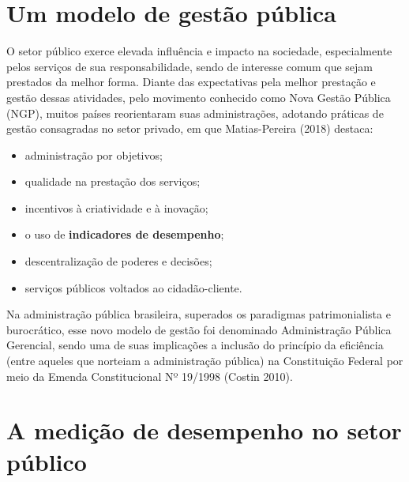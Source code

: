 \documentclass[
  letterpaper,
  DIV=11,
  numbers=noendperiod]{scrreprt}
\begin{document}
\hypertarget{um-modelo-de-gestuxe3o-puxfablica}{%
\section*{Um modelo de gestão
pública}\label{um-modelo-de-gestuxe3o-puxfablica}}


O setor público exerce elevada influência e impacto na sociedade,
especialmente pelos serviços de sua responsabilidade, sendo de interesse
comum que sejam prestados da melhor forma. Diante das expectativas pela
melhor prestação e gestão dessas atividades, pelo movimento conhecido
como Nova Gestão Pública (NGP), muitos países reorientaram suas
administrações, adotando práticas de gestão consagradas no setor
privado, em que Matias-Pereira (2018) destaca:

\begin{itemize}
\item
  administração por objetivos;
\item
  qualidade na prestação dos serviços;
\item
  incentivos à criatividade e à inovação;
\item
  o uso de \textbf{indicadores de desempenho};
\item
  descentralização de poderes e decisões;
\item
  serviços públicos voltados ao cidadão-cliente.
\end{itemize}

Na administração pública brasileira, superados os paradigmas
patrimonialista e burocrático, esse novo modelo de gestão foi denominado
Administração Pública Gerencial, sendo uma de suas implicações a
inclusão do princípio da eficiência (entre aqueles que norteiam a
administração pública) na Constituição Federal por meio da Emenda
Constitucional Nº 19/1998 (Costin 2010).

\hypertarget{a-mediuxe7uxe3o-de-desempenho-no-setor-puxfablico}{%
\section*{A medição de desempenho no setor
público}\label{a-mediuxe7uxe3o-de-desempenho-no-setor-puxfablico}}

\end{document}

